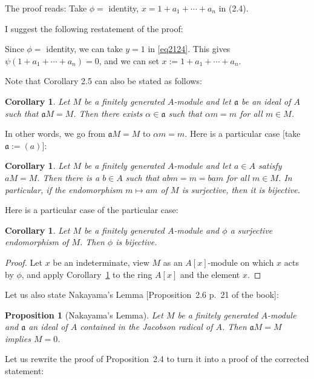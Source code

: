 \documentclass[12pt,letterpaper]{article}%
\newcommand{\mf}{\mathfrak}
\newcommand{\aaa}{\mf a}
\newtheorem{cor}[thm]{Corollary}
\newtheorem{prop}[thm]{Proposition}
\begin{document}
The proof reads: Take $\phi=$ identity, $x=1+a_1+\cdots+a_n$ in (2.4).

I suggest the following restatement of the proof:

Since $\phi=$ identity, we can take $y=1$ in \eqref{eq2124}. This gives $\psi(1+a_1+\cdots+a_n)=0$, and we can set $x:=1+a_1+\cdots+a_n$.

Note that Corollary 2.5 can also be stated as follows: 

\begin{cor}
Let $M$ be a finitely generated $A$-module and let $\aaa$ be an ideal of $A$ such that $\aaa M=M$. Then there exists $\alpha\in\aaa$ such that $\alpha m=m$ for all $m\in M$.
\end{cor}

In other words, we go from $\aaa M=M$ to $\alpha m=m$. Here is a particular case [take $\aaa:=(a)$]: 

\begin{cor}\label{ak}
Let $M$ be a finitely generated $A$-module and let $a\in A$ satisfy $aM=M$. Then there is a $b\in A$ such that $abm=m=bam$ for all $m\in M$. In particular, if the endomorphism $m\mapsto am$ of $M$ is surjective, then it is bijective. 
\end{cor}

Here is a particular case of the particular case: 

\begin{cor}\label{notor}
Let $M$ be a finitely generated $A$-module and $\phi$ a surjective endomorphism of $M$. Then $\phi$ is bijective. 
\end{cor} 

\begin{proof}
Let $x$ be an indeterminate, view $M$ as an $A[x]$-module on which $x$ acts by $\phi$, and apply Corollary~\ref{ak} to the ring $A[x]$ and the element $x$. 
\end{proof}

Let us also state Nakayama's Lemma [Proposition~2.6 p.~21 of the book]:

\begin{prop}[Nakayama's Lemma]\label{nak}
Let $M$ be a finitely generated $A$-module and $\aaa$ an ideal of $A$ contained in the Jacobson radical of $A$. Then $\aaa M=M$ implies $M=0$. 
\end{prop}

Let us rewrite the proof of Proposition~2.4 to turn it into a proof of the corrected statement: 
\end{document}
